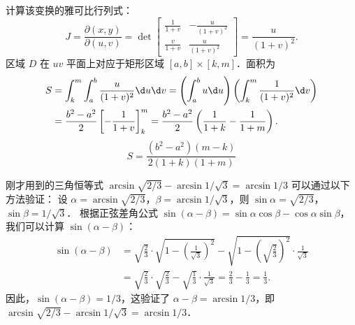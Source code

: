 \begin{solution}
    计算该变换的雅可比行列式：
    \begin{equation}
        J = \frac{\partial(x, y)}{\partial(u, v)} = \det \begin{bmatrix} \frac{1}{1+v} & -\frac{u}{(1+v)^2} \\ \frac{v}{1+v} & \frac{u}{(1+v)^2} \end{bmatrix} = \frac{u}{(1+v)^2}.
    \end{equation}
    区域 $D$ 在 $uv$ 平面上对应于矩形区域 $[a, b] \times [k, m]$．面积为
    \begin{equation}
        \begin{aligned}
            S & = \int_{k}^{m} \int_{a}^{b} \frac{u}{(1+v)^2} \d u \d v = \left( \int_{a}^{b} u \d u \right) \left( \int_{k}^{m} \frac{1}{(1+v)^2} \d v \right) \\
              & = \frac{b^2 - a^2}{2} \left[ -\frac{1}{1+v} \right]_{k}^{m} = \frac{b^2 - a^2}{2} \left( \frac{1}{1+k} - \frac{1}{1+m} \right).
        \end{aligned}
    \end{equation}
    \begin{equation}
        S = \boxed{\frac{(b^2 - a^2)(m - k)}{2(1+k)(1+m)}}
    \end{equation}
\end{solution}

\begin{note}{}{}
    刚才用到的三角恒等式 $\arcsin \sqrt{2/3} - \arcsin 1/\sqrt{3} = \arcsin 1/3$ 可以通过以下方法验证：
    设 $\alpha = \arcsin \sqrt{2/3}$，$\beta = \arcsin 1/\sqrt{3}$，则 $\sin \alpha = \sqrt{2/3}$，$\sin \beta = 1/\sqrt{3}$．
    根据正弦差角公式 $\sin(\alpha - \beta) = \sin \alpha \cos \beta - \cos \alpha \sin \beta$，我们可以计算 $\sin(\alpha - \beta)$：
    \begin{equation}
        \begin{aligned}
            \sin(\alpha - \beta) & = \sqrt{\frac{2}{3}} \cdot \sqrt{1 - \left(\frac{1}{\sqrt{3}}\right)^2} - \sqrt{1 - \left(\sqrt{\frac{2}{3}}\right)^2} \cdot \frac{1}{\sqrt{3}} \\
                                 & = \sqrt{\frac{2}{3}} \cdot \sqrt{\frac{2}{3}} - \sqrt{\frac{1}{3}} \cdot \frac{1}{\sqrt{3}} = \frac{2}{3} - \frac{1}{3} = \frac{1}{3}.
        \end{aligned}
    \end{equation}
    因此，$\sin(\alpha - \beta) = 1/3$，这验证了 $\alpha - \beta = \arcsin 1/3$，即 $\arcsin \sqrt{2/3} - \arcsin 1/\sqrt{3} = \arcsin 1/3$．
\end{note}

